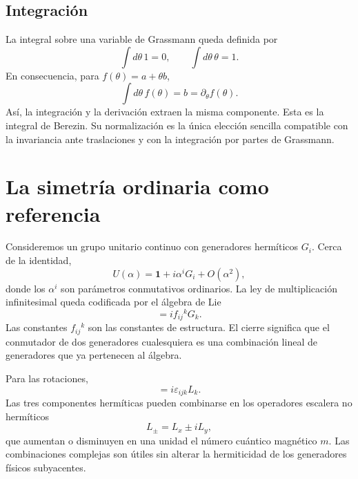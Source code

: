 \subsection{Integración}

La integral sobre una variable de Grassmann queda definida por
\begin{equation}
\int d\theta\,1=0,
\qquad
\int d\theta\,\theta=1.
\end{equation}
En consecuencia, para \(f(\theta)=a+\theta b\),
\begin{equation}
\int d\theta\,f(\theta)=b=\partial_\theta f(\theta).
\end{equation}
Así, la integración y la derivación extraen la misma componente. Esta es la integral de Berezin. Su normalización es la única elección sencilla compatible con la invariancia ante traslaciones y con la integración por partes de Grassmann. 

\section{La simetría ordinaria como referencia}

Consideremos un grupo unitario continuo con generadores hermíticos \(G_i\). Cerca de la identidad,
\begin{equation}
U(\alpha)=\mathbf 1+i\alpha^iG_i+O(\alpha^2),
\end{equation}
donde los \(\alpha^i\) son parámetros conmutativos ordinarios. La ley de multiplicación infinitesimal queda codificada por el álgebra de Lie
\begin{equation}
[G_i,G_j]=i f_{ij}{}^{k}G_k.
\end{equation}
Las constantes \(f_{ij}{}^k\) son las constantes de estructura. El cierre significa que el conmutador de dos generadores cualesquiera es una combinación lineal de generadores que ya pertenecen al álgebra.

Para las rotaciones,
\begin{equation}
[L_i,L_j]=i\varepsilon_{ijk}L_k.
\end{equation}
Las tres componentes hermíticas pueden combinarse en los operadores escalera no hermíticos
\begin{equation}
L_\pm=L_x\pm iL_y,
\end{equation}
que aumentan o disminuyen en una unidad el número cuántico magnético \(m\). Las combinaciones complejas son útiles sin alterar la hermiticidad de los generadores físicos subyacentes.

